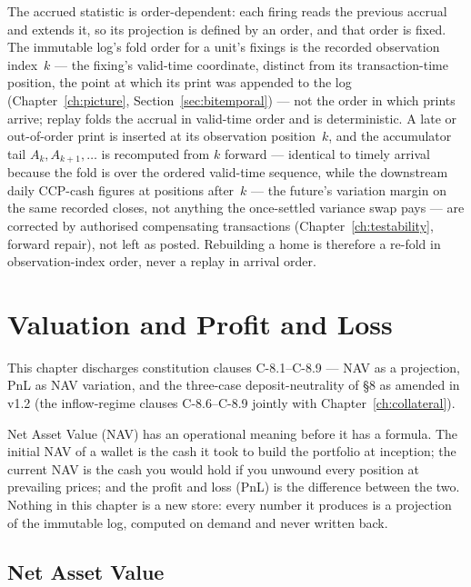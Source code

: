 \documentclass[11pt,a4paper]{article}
\begin{document}
The accrued statistic is order-dependent: each firing reads the previous accrual and
extends it, so its projection is defined by an order, and that order is fixed. The
immutable log's fold order for a unit's fixings is the recorded observation index~$k$ ---
the fixing's valid-time coordinate, distinct from its transaction-time position, the point
at which its print was appended to the log (Chapter~\ref{ch:picture},
Section~\ref{sec:bitemporal}) --- not the order in which prints arrive; replay folds the
accrual in valid-time order and is deterministic. A late or out-of-order print is inserted
at its observation position~$k$, and the accumulator tail $A_{k},A_{k+1},\dots$ is
recomputed from $k$ forward --- identical to timely arrival because the fold is over the
ordered valid-time sequence,
while the downstream daily CCP-cash figures at positions after~$k$ --- the future's
variation margin on the same recorded closes, not anything the once-settled variance swap
pays --- are corrected by authorised compensating transactions
(Chapter~\ref{ch:testability}, forward repair), not left as posted. Rebuilding a home is therefore a re-fold in
observation-index order, never a replay in arrival order.

\section{Valuation and Profit and Loss}\label{ch:valuation}

This chapter discharges constitution clauses C-8.1--C-8.9 --- NAV as a projection, PnL as NAV variation, and the three-case deposit-neutrality of \S8 as amended in v1.2 (the inflow-regime clauses C-8.6--C-8.9 jointly with Chapter~\ref{ch:collateral}).

Net Asset Value (NAV) has an operational meaning before it has a formula.
The initial NAV of a wallet is the cash it took to build the portfolio at
inception; the current NAV is the cash you would hold if you unwound every
position at prevailing prices; and the profit and loss (PnL) is the
difference between the two. Nothing in this chapter is a new store: every
number it produces is a projection of the immutable log, computed on demand
and never written back.

\subsection{Net Asset Value}
\end{document}
